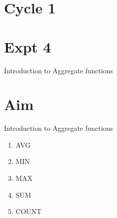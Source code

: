 \documentclass[13pt,oneside]{book}
\begin{document}
\section*{Cycle 1}
\section*{Expt 4}
\begin{center}
    \Large{Introduction to Aggregate functions}
\end{center}

\section*{Aim}
\large{Introduction to Aggregate functions
\begin{enumerate}
	\item AVG
	\item MIN
	\item MAX
	\item SUM
	\item COUNT
\end{enumerate}
}
\end{document}
